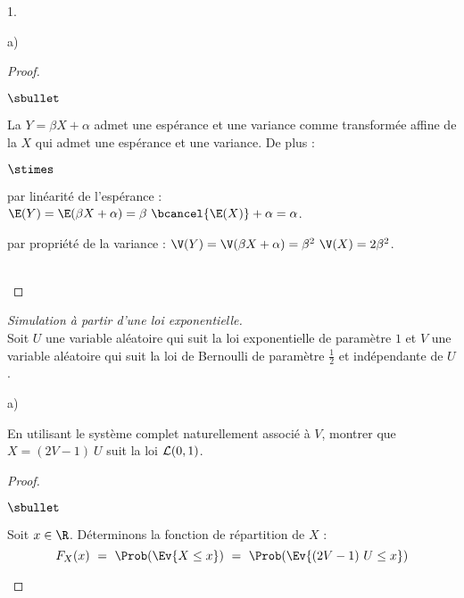 \documentclass[11pt]{article}%
\begin{document}
\begin{noliste}{1.}
\begin{noliste}{a)}
\begin{proof}
\begin{noliste}{$\sbullet$}
        
        
      \item La \var $Y = \beta X + \alpha$ admet une espérance et une
        variance comme transformée affine de la \var $X$ qui admet une
        espérance et une variance. De plus : 
        \begin{noliste}{$\stimes$}
        \item par linéarité de l'espérance : $\E(Y) = \E(\beta X +
          \alpha) = \beta \ \bcancel{\E(X)} + \alpha = \alpha$.

        \item par propriété de la variance : $\V(Y) = \V(\beta X +
          \alpha) = \beta^2 \ \V(X) = 2 \beta^2$.
        \end{noliste}
      \end{noliste}
      ~\\[-1.2cm]
    \end{proof}
  \end{noliste}

\item {\em Simulation à partir d'une loi exponentielle.}\\
  Soit $U$ une variable aléatoire qui suit la loi exponentielle de
  paramètre $1$ et $V$ une variable aléatoire qui suit la loi de
  Bernoulli de paramètre $\frac{1}{2}$ et indépendante de $U$.
  \begin{noliste}{a)}
    \setlength{\itemsep}{2mm} %
  \item En utilisant le système complet naturellement associé à $V$,
    montrer que $X = (2V-1) \ U$ suit la loi ${\cal L}(0,1)$.

    \begin{proof}~%
      \begin{noliste}{$\sbullet$}
      \item Soit $x \in \R$. Déterminons la fonction de répartition de 
      $X$ :
        \[
        F_X(x) \ = \ \Prob(\Ev{X \leq x}) \ = \ \Prob(\Ev{(2V - 1) \ U 
	\leq x})
        \]


\end{noliste}
\end{proof}
\end{noliste}
\end{noliste}
\end{document}
